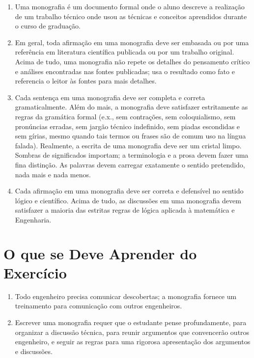 \begin{enumerate}
	
	\item Uma monografia \'{e} um documento formal onde o aluno descreve a realiza\c{c}\~{a}o de um trabalho t\'{e}cnico onde usou as t\'{e}cnicas e conceitos aprendidos durante o curso de 	gradua\c{c}\~{a}o.

	\item Em geral, toda afirma\c{c}\~{a}o em uma monografia deve ser embasada ou por uma referência em literatura cient\'{i}fica publicada ou por um trabalho original.
	Acima de tudo, uma monografia n\~{a}o repete os detalhes do pensamento cr\'{i}tico e an\'{a}lises encontradas nas fontes publicadas; usa o resultado como fato e 
	referencia o leitor às fontes para mais detalhes. 

	\item Cada senten\c{c}a em uma monografia deve ser completa e correta gramaticalmente. Al\'{e}m do mais, a monografia deve satisfazer estritamente as 
	regras da gram\'{a}tica formal (e.x., sem contra\c{c}\~{o}es, sem coloquialismo, sem pron\'{u}ncias erradas, sem jarg\~{a}o t\'{e}cnico indefinido, sem piadas escondidas e sem g\'{i}rias,
	mesmo quando tais termos ou frases s\~{a}o de comum uso na l\'{i}ngua falada). Realmente, a escrita de uma monografia deve ser um cristal limpo.
	Sombras de significados importam; a terminologia e a prosa devem fazer uma fina distin\c{c}\~{a}o. As palavras devem carregar exatamente o sentido pretendido, nada mais e nada 	menos.

	\item Cada afirma\c{c}\~{a}o em uma monografia deve ser correta e defens\'{i}vel no sentido l\'{o}gico e cient\'{i}fico. Acima de tudo, as discuss\~{o}es em uma monografia devem satisfazer
	a maioria das estritas regras de l\'{o}gica aplicada à matem\'{a}tica e Engenharia.                       

\end{enumerate}

\section{O que se Deve Aprender do Exerc\'{i}cio}

\begin{enumerate}

	\item Todo engenheiro precisa comunicar descobertas; a monografia fornece um treinamento para comunica\c{c}\~{a}o com outros engenheiros.

	\item Escrever uma monografia requer que o estudante pense profundamente, para organizar a discuss\~{a}o t\'{e}cnica, para reunir argumentos que convencer\~{a}o outros engenheiro,
	e seguir as regras para uma rigorosa apresenta\c{c}\~{a}o dos argumentos e discuss\~{o}es.

\end{enumerate}


